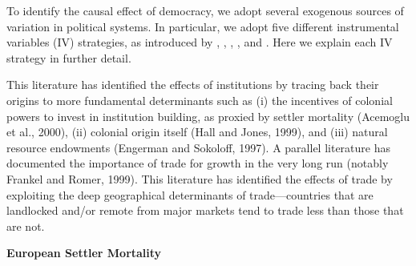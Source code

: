 
To identify the causal effect of democracy, we adopt several exogenous sources of variation in political systems. In particular, we adopt five different instrumental variables (IV) strategies, as introduced by \citet{ajr}, \citet{hj}, \citet{econ-con}, \citet{easterly2003}, and \citet{ajr2014}. Here we explain each IV strategy in further detail. 

This literature has identified the effects of institutions by tracing back their origins to more fundamental determinants such as (i) the incentives of colonial powers to invest in institution building, as proxied by settler mortality (Acemoglu et al., 2000), (ii) colonial origin itself (Hall and Jones, 1999), and (iii) natural resource endowments (Engerman and Sokoloff, 1997). A parallel literature has documented the importance of trade for growth in the very long run (notably Frankel and Romer, 1999). This literature has identified the effects of trade by exploiting the deep geographical determinants of trade—countries that are landlocked and/or remote from major markets tend to trade less than those that are not.

\noindent \textbf{European Settler Mortality} 

